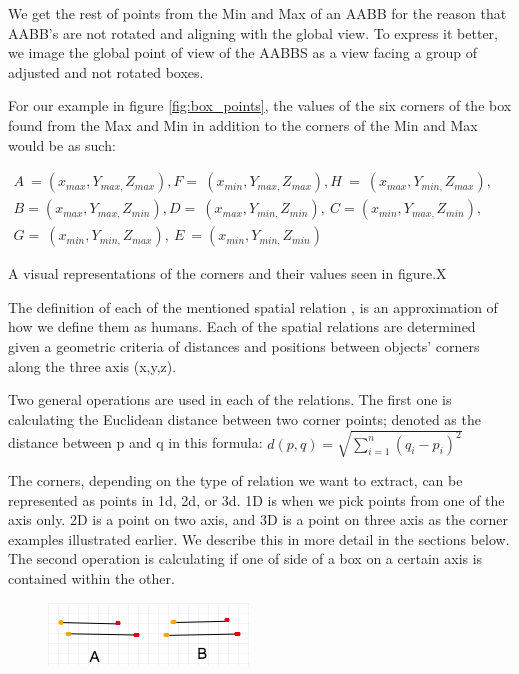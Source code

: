 We get the rest of points from the Min and Max of an AABB for the reason that AABB's are not rotated and aligning with the global view. To express it better, we image the global point of view of the AABBS as a view facing a group of adjusted and not rotated boxes. 

For our example in figure \ref{fig:box_points}, the values of the six corners of the box found from the Max and Min in addition to the corners of the Min and Max would be as such: 

$\begin{array}{l}
A\ =( x_{max} ,Y_{max,} Z_{max}) ,F=\ ( x_{min} ,Y_{max,} Z_{max}) ,H\ =\ ( x_{max} ,Y_{min,} Z_{max}) ,\\
B=( x_{max} ,Y_{max,} Z_{min}) ,D=\ ( x_{max} ,Y_{min,} Z_{min}) ,\ C=( x_{min} ,Y_{max,} Z_{min}) ,\\
G=\ ( x_{min} ,Y_{min,} Z_{max}) ,\ E\ =( x_{min} ,Y_{min,} Z_{min})
\end{array}$

  


A visual representations of the corners and their values seen in figure.X 


The definition of each of the mentioned spatial relation , is an approximation of how we define them as humans. Each of the spatial relations are determined given a geometric criteria of distances and positions between objects' corners along the three axis  (x,y,z). 

Two general operations are used in each of the relations. The first one is calculating  the Euclidean distance between two corner points; denoted as the distance between p and q in this formula:  \begin{math}
 d\left( p,q\right)   = \sqrt {\sum _{i=1}^{n}  \left( q_{i}-p_{i}\right)^2 } 
 \end{math}

The corners, depending on the type of relation we want to extract, can be represented as points in  1d, 2d, or 3d. 1D is  when we pick points from one of the axis only. 2D is a point on two axis, and 3D is a point on three axis as the corner examples illustrated earlier. We describe this in more detail in the sections below. The second operation is calculating if one of side of a box on a certain axis is contained within the other. 

\begin{figure}[H]
\includegraphics[scale=0.5]{images/contained.png}
\caption{}
\label{fig:contained}
\end{figure}

